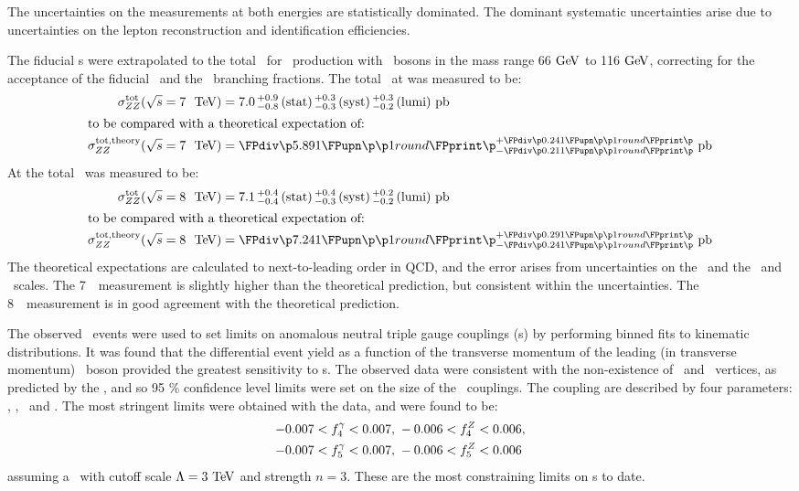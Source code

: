 The uncertainties on the measurements at both energies are statistically
dominated. The dominant systematic uncertainties arise due to uncertainties on
the lepton reconstruction and identification efficiencies. 

The fiducial \cx s were extrapolated to the total \cx\ for \ZZ\
production with \Z\ bosons in the mass range 66$\GeV$ to 116$\GeV$, 
correcting for the acceptance of the fiducial \phasespace\ and the \Zll\
branching fractions. The total \cx\ at  was measured to be:
\begin{align}
\sigmaTotZZ(\sqrtseq{7}) &= \ZZSevenTeVTotalCrossSection \\
\intertext{to be compared with a theoretical expectation of:}
\sigmaTotTheoryZZ(\sqrtseq{7}) &= \ZZSevenTeVTheoryTotalCrossSection
\end{align}
At \sqrtseq{8} the total \cx\ was measured to be:
\begin{align}
\sigmaTotZZ(\sqrtseq{8}) &= \ZZEightTeVTotalCrossSection \\
\intertext{to be compared with a theoretical expectation of:}
\sigmaTotTheoryZZ(\sqrtseq{8}) &= \ZZEightTeVTheoryTotalCrossSection
\end{align}
The theoretical expectations are calculated to next-to-leading order in QCD, and
the error arises from uncertainties on the \partDF\ and the \fact\ and \renorm\
scales. The 7~\tev\ measurement is slightly higher than the theoretical prediction,
but consistent within the uncertainties. The 8~\tev\ measurement is in good
agreement with the theoretical prediction. 

The observed \ZZllll\ events were used to set limits on anomalous neutral triple
gauge couplings (\TGC s) by performing binned fits to kinematic distributions.
It was found that the differential event yield as a function of the transverse
momentum of the leading (in transverse momentum) \Z\ boson provided the
greatest sensitivity to \TGC s. The observed data were consistent with the non-existence of 
\ZZZ\ and \ZZg\ vertices, as predicted by the \sm, and so 95 \% confidence level
limits were set on the size of the \TGC\ couplings. The coupling are
described by four parameters: \ffourg, \ffourZ, \ffiveg\ and \ffiveZ. The
most stringent limits were obtained with the \sqrtseq{8} data, and were found to
be:
\begin{align}
-0.007 < f_{4}^{\gamma} < 0.007, &\; -0.006 < f_{4}^{Z} < 0.006, \nonumber \\
-0.007 < f_{5}^{\gamma} < 0.007, &\; -0.006 < f_{5}^{Z} < 0.006
\end{align}
assuming a \formfactor\ with cutoff scale $\Lambda=3 \tev$ and strength $n=3$.
These are the most constraining limits on \TGC s to date.
